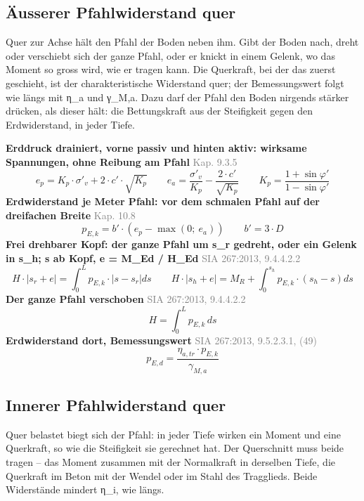 \documentclass[11pt,a4paper]{article}
\newcommand{\normref}[1]{{\small\textcolor{gray}{#1}}}
\begin{document}
\subsection{Äusserer Pfahlwiderstand quer}
Quer zur Achse hält den Pfahl der Boden neben ihm. Gibt der Boden nach, dreht oder verschiebt sich der ganze Pfahl, oder er knickt in einem Gelenk, wo das Moment so gross wird, wie er tragen kann. Die Querkraft, bei der das zuerst geschieht, ist der charakteristische Widerstand quer; der Bemessungswert folgt wie längs mit η\_a und γ\_M,a. Dazu darf der Pfahl den Boden nirgends stärker drücken, als dieser hält: die Bettungskraft aus der Steifigkeit gegen den Erdwiderstand, in jeder Tiefe.

\noindent\textbf{Erddruck drainiert, vorne passiv und hinten aktiv: wirksame Spannungen, ohne Reibung am Pfahl} \hfill \normref{Kap. 9.3.5}
\begin{equation*}
e_p = K_p \cdot \sigma'_v + 2 \cdot c' \cdot \sqrt{K_p} \qquad e_a = \frac{\sigma'_v}{K_p} - \frac{2 \cdot c'}{\sqrt{K_p}} \qquad K_p = \frac{1 + \sin\varphi'}{1 - \sin\varphi'}
\end{equation*}
\noindent\textbf{Erdwiderstand je Meter Pfahl: vor dem schmalen Pfahl auf der dreifachen Breite} \hfill \normref{Kap. 10.8}
\begin{equation*}
p_{E,k} = b' \cdot \left(e_p - \max\left(0;\ e_a\right)\right) \qquad b' = 3 \cdot D
\end{equation*}
\noindent\textbf{Frei drehbarer Kopf: der ganze Pfahl um s\_r gedreht, oder ein Gelenk in s\_h; s ab Kopf, e = M\_Ed / H\_Ed} \hfill \normref{SIA 267:2013, 9.4.4.2.2}
\begin{equation*}
H \cdot \left|s_r + e\right| = \int_0^L p_{E,k} \cdot \left|s - s_r\right| ds \qquad H \cdot \left|s_h + e\right| = M_R + \int_0^{s_h} p_{E,k} \cdot \left(s_h - s\right) ds
\end{equation*}
\noindent\textbf{Der ganze Pfahl verschoben} \hfill \normref{SIA 267:2013, 9.4.4.2.2}
\begin{equation*}
H = \int_0^L p_{E,k}\, ds
\end{equation*}
\noindent\textbf{Erdwiderstand dort, Bemessungswert} \hfill \normref{SIA 267:2013, 9.5.2.3.1, (49)}
\begin{equation*}
p_{E,d} = \frac{\eta_{a,tr} \cdot p_{E,k}}{\gamma_{M,a}}
\end{equation*}
\subsection{Innerer Pfahlwiderstand quer}
Quer belastet biegt sich der Pfahl: in jeder Tiefe wirken ein Moment und eine Querkraft, so wie die Steifigkeit sie gerechnet hat. Der Querschnitt muss beide tragen – das Moment zusammen mit der Normalkraft in derselben Tiefe, die Querkraft im Beton mit der Wendel oder im Stahl des Tragglieds. Beide Widerstände mindert η\_i, wie längs.
\end{document}
